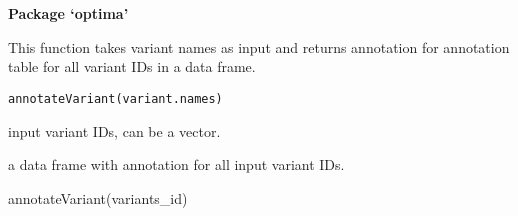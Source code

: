 \documentclass[a4paper]{book}
\begin{document}
\chapter*{}
\begin{center}
{\textbf{\huge Package `optima'}}
\par\bigskip{\large \today}
\end{center}
\begin{description}
\raggedright{}
\item[Title]
\item[Version]
\item[Description]
\item[License]
\item[Encoding]
\item[Roxygen]
\item[RoxygenNote]
\end{description}
%
\begin{Description}\relax
This function takes variant names as input and
returns annotation for annotation table for all variant IDs in a data frame.
\end{Description}
%
\begin{Usage}
\begin{verbatim}
annotateVariant(variant.names)
\end{verbatim}
\end{Usage}
%
\begin{Arguments}
\begin{ldescription}
\item[\code{variant.names}] input variant IDs, can be a vector.
\end{ldescription}
\end{Arguments}
%
\begin{Value}
a data frame with annotation for all input variant IDs.
\end{Value}
%
\begin{Examples}
\begin{ExampleCode}
annotateVariant(variants_id)

\end{ExampleCode}
\end{Examples}
\end{document}
